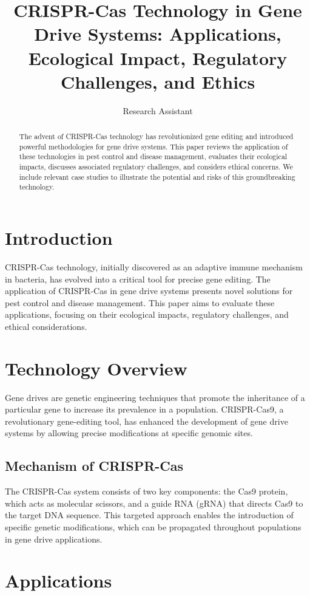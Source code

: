 \documentclass[12pt]{article}
\title{CRISPR-Cas Technology in Gene Drive Systems: Applications, Ecological Impact, Regulatory Challenges, and Ethics}
\author{Research Assistant}
\date{}
\begin{document}
\maketitle

\begin{abstract}
The advent of CRISPR-Cas technology has revolutionized gene editing and introduced powerful methodologies for gene drive systems. This paper reviews the application of these technologies in pest control and disease management, evaluates their ecological impacts, discusses associated regulatory challenges, and considers ethical concerns. We include relevant case studies to illustrate the potential and risks of this groundbreaking technology.
\end{abstract}

\section{Introduction}
CRISPR-Cas technology, initially discovered as an adaptive immune mechanism in bacteria, has evolved into a critical tool for precise gene editing. The application of CRISPR-Cas in gene drive systems presents novel solutions for pest control and disease management. This paper aims to evaluate these applications, focusing on their ecological impacts, regulatory challenges, and ethical considerations.

\section{Technology Overview}
Gene drives are genetic engineering techniques that promote the inheritance of a particular gene to increase its prevalence in a population. CRISPR-Cas9, a revolutionary gene-editing tool, has enhanced the development of gene drive systems by allowing precise modifications at specific genomic sites.

\subsection{Mechanism of CRISPR-Cas}
The CRISPR-Cas system consists of two key components: the Cas9 protein, which acts as molecular scissors, and a guide RNA (gRNA) that directs Cas9 to the target DNA sequence. This targeted approach enables the introduction of specific genetic modifications, which can be propagated throughout populations in gene drive applications.

\section{Applications}
\end{document}
